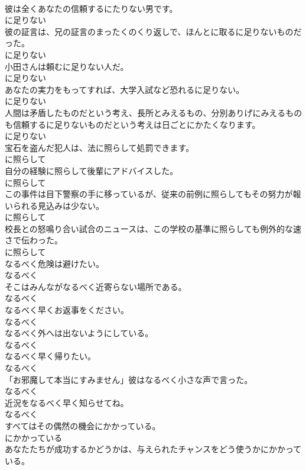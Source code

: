 \documentclass[8pt]{extreport}
\begin{document}
\begin{CJK}{UTF8}{min}
\\	彼は全くあなたの信頼するにたりない男です。	
\\	に足りない
\\	彼の証言は、兄の証言のまったくのくり返しで、ほんとに取るに足りないものだった。	
\\	に足りない
\\	小田さんは頼むに足りない人だ。	
\\	に足りない
\\	あなたの実力をもってすれば、大学入試など恐れるに足りない。	
\\	に足りない
\\	人間は矛盾したものだという考え、長所とみえるもの、分別ありげにみえるものも信頼するに足りないものだという考えは日ごとにかたくなります。	
\\	に足りない
\\	宝石を盗んだ犯人は、法に照らして処罰できます。	
\\	に照らして
\\	自分の経験に照らして後輩にアドバイスした。	
\\	に照らして
\\	この事件は目下警察の手に移っているが、従来の前例に照らしてもその努力が報いられる見込みは少ない。	
\\	に照らして
\\	校長との怒鳴り合い試合のニュースは、この学校の基準に照らしても例外的な速さで伝わった。	
\\	に照らして
\\	なるべく危険は避けたい。	
\\	なるべく
\\	そこはみんながなるべく近寄らない場所である。	
\\	なるべく
\\	なるべく早くお返事をください。	
\\	なるべく
\\	なるべく外へは出ないようにしている。	
\\	なるべく
\\	なるべく早く帰りたい。	
\\	なるべく
\\	「お邪魔して本当にすみません」彼はなるべく小さな声で言った。	
\\	なるべく
\\	近況をなるべく早く知らせてね。	
\\	なるべく
\\	すべてはその偶然の機会にかかっている。	
\\	にかかっている
\\	あなたたちが成功するかどうかは、与えられたチャンスをどう使うかにかかっている。	

\end{CJK}
\end{document}
